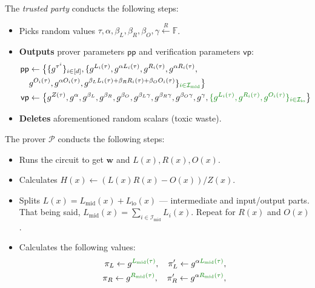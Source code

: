 \documentclass[../lecture-notes.tex]{subfiles}
\begin{document}
\begin{tcolorbox}
    The \emph{trusted party} conducts the following steps:
    \begin{itemize}[label=]
        \item Picks random values $\tau, \alpha, \beta_L, \beta_R, \beta_O, \gamma \xleftarrow{R} \mathbb{F}$.
        \item \textbf{Outputs} prover parameters $\mathsf{pp}$ and verification parameters $\mathsf{vp}$:
        \begin{align*}
            \mathsf{pp} &\gets \big\{\{g^{\tau^i}\}_{i \in [d]}, \{g^{L_i(\tau)}, g^{\alpha L_i(\tau)}, g^{R_i(\tau)}, g^{\alpha R_i(\tau)}, \\ 
            & g^{O_i(\tau)}, g^{\alpha O_i(\tau)}, g^{\beta_LL_i(\tau)+\beta_RR_i(\tau)+\beta_OO_i(\tau)}\}_{\textcolor{green!50!black}{i \in \mathcal{I}_{\text{mid}}}}\big\} \\
            \mathsf{vp} &\gets \big\{ g^{Z(\tau)}, g^{\alpha}, g^{\beta_L}, g^{\beta_R}, g^{\beta_O}, g^{\beta_L\gamma}, g^{\beta_R\gamma}, g^{\beta_O\gamma}, g^{\gamma}, \textcolor{green!50!black}{ \{g^{L_i(\tau)}, g^{R_i(\tau)}, g^{O_i(\tau)}\}_{i \in \mathcal{I}_{\text{io}}} } \big\}
        \end{align*}
        \item \textbf{Deletes} aforementioned random scalars (toxic waste).
    \end{itemize}
    The prover $\mathcal{P}$ conducts the following steps:
    \begin{itemize}[label=]
        \item Runs the circuit to get $\mathbf{w}$ and $L(x),R(x),O(x)$.
        \item Calculates $H(x) \gets (L(x)R(x) - O(x))\big/ Z(x)$.
        \item \textcolor{green!50!black}{Splits $L(x) = L_{\text{mid}}(x) + L_{\text{io}}(x)$ --- intermediate and input/output parts. That being said, $L_{\text{mid}}(x) = \sum_{i \in \mathcal{I}_{\text{mid}}}L_i(x)$. Repeat for $R(x)$ and $O(x)$.}
        \item Calculates the following values: 
        \begin{align*}
            \pi_L \gets g^{\textcolor{green!50!black}{L_{\text{mid}}(\tau)}}, \quad \pi_L' \gets g^{\alpha \textcolor{green!50!black}{L_{\text{mid}}(\tau)}}, \\
            \pi_R \gets g^{\textcolor{green!50!black}{R_{\text{mid}}(\tau)}}, \quad \pi_R' \gets g^{\alpha \textcolor{green!50!black}{R_{\text{mid}}(\tau)}}, \\

\end{align*}
\end{itemize}
\end{tcolorbox}
\end{document}
